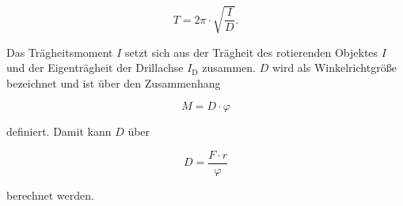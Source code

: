 \begin{equation}
    T = 2\pi \cdot \sqrt{\frac{I}{D}}.
    \label{eq:periodendauer}
\end{equation}

Das Trägheitsmoment $I$ setzt sich aus der Trägheit des rotierenden Objektes $I$ und der Eigenträgheit der Drillachse $I_\text{D}$ zusammen. $D$ wird als Winkelrichtgröße bezeichnet und ist über den Zusammenhang  

\begin{equation}
    M = D \cdot \varphi
    \label{eq:winkelrichtgroesse}
\end{equation}

definiert. Damit kann $D$ über 

\begin{equation}
    D = \frac{F \cdot r}{\varphi}
    \label{eq:winkelrichtgroesse2}
\end{equation}

berechnet werden.